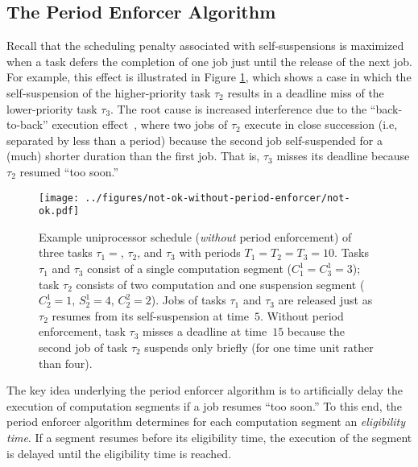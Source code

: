 \subsection{The Period Enforcer Algorithm}
\label{sec:pe}

Recall that the scheduling penalty associated with self-suspensions is maximized when a task defers the completion of one job just until the release of the next job. For example, this effect is illustrated in Figure \ref{fig:not-ok-without-period-enforcement}, which shows a case in which the self-suspension of the higher-priority task $\tau_2$  results in a deadline miss of the lower-priority task $\tau_3$. The root cause is increased interference due to the ``back-to-back'' execution effect~\cite{LSS:87,LSST:91,Ra:90,ABRTW:93,SLS:95}, where two jobs of $\tau_2$ execute in close succession (i.e, separated by less than a period) because the second job self-suspended for a (much) shorter duration than the first job. That is, $\tau_3$ misses its deadline because $\tau_2$ resumed ``too soon.''

\begin{figure}[t]
  \centering
  \texttt{[image: ../figures/not-ok-without-period-enforcer/not-ok.pdf]}
  \caption{Example uniprocessor schedule (\emph{without} period enforcement) of three tasks $\tau_1 = $, $\tau_2$, and $\tau_3$ with periods $T_1 = T_2 = T_3 = 10$. Tasks $\tau_1$ and $\tau_3$ consist of a single computation segment ($C_1^1 = C_3^1 = 3$); task $\tau_2$ consists of two computation and one suspension segment ($C_2^1 = 1$, $S_2^1 = 4$, $C_2^2 = 2$). Jobs of tasks $\tau_1$ and $\tau_3$ are released just as $\tau_2$ resumes from its self-suspension at time~$5$. Without period enforcement, task $\tau_3$ misses a deadline at time~$15$ because the second job of  task $\tau_2$ suspends only briefly (for one time unit rather than four).}
  \label{fig:not-ok-without-period-enforcement}
\end{figure}


The key idea underlying the period enforcer algorithm is to artificially delay the execution of computation segments if a job resumes ``too soon.'' To this end,  the period enforcer algorithm determines for each computation segment an \emph{eligibility time}. If a segment resumes  before its eligibility time, the execution of the segment is delayed until the eligibility time is reached.

